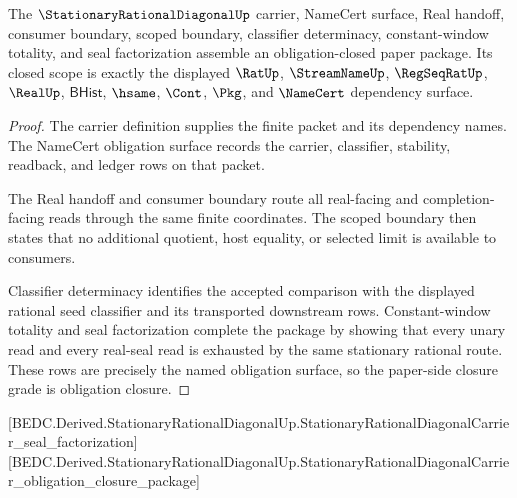 \begin{theorem}
\label{thm:stationary-rational-diagonal-obligation-closure-package}
The $\StationaryRationalDiagonalUp$ carrier, NameCert surface, Real handoff,
consumer boundary, scoped boundary, classifier determinacy, constant-window
totality, and seal factorization assemble an obligation-closed paper package.
Its closed scope is exactly the displayed $\RatUp$, $\StreamNameUp$,
$\RegSeqRatUp$, $\RealUp$, $\mathsf{BHist}$, $\hsame$, $\Cont$, $\Pkg$, and
$\NameCert$ dependency surface.
\end{theorem}
\begin{proof}
The carrier definition supplies the finite packet and its dependency names. The
NameCert obligation surface records the carrier, classifier, stability,
readback, and ledger rows on that packet.

The Real handoff and consumer boundary route all real-facing and
completion-facing reads through the same finite coordinates. The scoped boundary
then states that no additional quotient, host equality, or selected limit is
available to consumers.

Classifier determinacy identifies the accepted comparison with the displayed
rational seed classifier and its transported downstream rows. Constant-window
totality and seal factorization complete the package by showing that every unary
read and every real-seal read is exhausted by the same stationary rational
route. These rows are precisely the named obligation surface, so the paper-side
closure grade is obligation closure.
\end{proof}

[BEDC.Derived.StationaryRationalDiagonalUp.StationaryRationalDiagonalCarrier\_seal\_factorization]
[BEDC.Derived.StationaryRationalDiagonalUp.StationaryRationalDiagonalCarrier\_obligation\_closure\_package]

